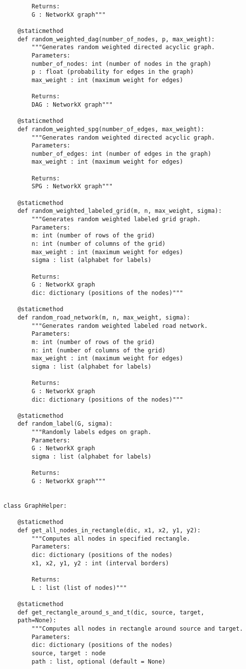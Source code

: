 \documentclass[]{article}
\numberwithin{equation}{section}
\begin{document}
\begin{appendices}
\begin{lstlisting}
		Returns:
		G : NetworkX graph"""
		
	@staticmethod
	def random_weighted_dag(number_of_nodes, p, max_weight):
		"""Generates random weighted directed acyclic graph.
		Parameters:
		number_of_nodes: int (number of nodes in the graph)
		p : float (probability for edges in the graph)
		max_weight : int (maximum weight for edges)
		
		Returns:
		DAG : NetworkX graph"""	
	
	@staticmethod
	def random_weighted_spg(number_of_edges, max_weight):
		"""Generates random weighted directed acyclic graph.
		Parameters:
		number_of_edges: int (number of edges in the graph)
		max_weight : int (maximum weight for edges)
		
		Returns:
		SPG : NetworkX graph"""	
	
	@staticmethod
	def random_weighted_labeled_grid(m, n, max_weight, sigma):
		"""Generates random weighted labeled grid graph.
		Parameters:
		m: int (number of rows of the grid)
		n: int (number of columns of the grid)
		max_weight : int (maximum weight for edges)
		sigma : list (alphabet for labels)
		
		Returns:
		G : NetworkX graph
		dic: dictionary (positions of the nodes)"""
	
	@staticmethod
	def random_road_network(m, n, max_weight, sigma):
		"""Generates random weighted labeled road network.
		Parameters:
		m: int (number of rows of the grid)
		n: int (number of columns of the grid)
		max_weight : int (maximum weight for edges)
		sigma : list (alphabet for labels)
		
		Returns:
		G : NetworkX graph
		dic: dictionary (positions of the nodes)"""
	
	@staticmethod
	def random_label(G, sigma):
		"""Randomly labels edges on graph.
		Parameters:
		G : NetworkX graph
		sigma : list (alphabet for labels)
		
		Returns:
		G : NetworkX graph"""


class GraphHelper:

	@staticmethod
	def get_all_nodes_in_rectangle(dic, x1, x2, y1, y2):
		"""Computes all nodes in specified rectangle.
		Parameters:
		dic: dictionary (positions of the nodes)
		x1, x2, y1, y2 : int (interval borders)
		
		Returns:
		L : list (list of nodes)"""
	
	@staticmethod
	def get_rectangle_around_s_and_t(dic, source, target,
	path=None):
		"""Computes all nodes in rectangle around source and target.
		Parameters:
		dic: dictionary (positions of the nodes)
		source, target : node
		path : list, optional (default = None)
		

\end{lstlisting}
\end{appendices}
\end{document}
